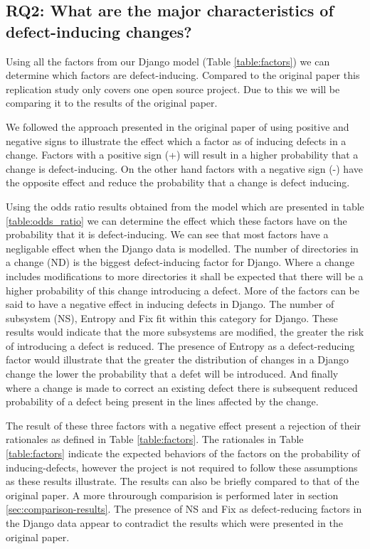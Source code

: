 \documentclass[10pt, conference]{IEEEtran}
\begin{document}
\subsection{RQ2: What are the major characteristics of defect-inducing changes?}
\label{sec:rq2}

Using all the factors from our Django model (Table \ref{table:factors}) we can determine which factors are defect-inducing. Compared to the original paper this replication study only covers one open source project. Due to this we will be comparing it to the results of the original paper. 

We followed the approach presented in the original paper of using positive and negative signs to illustrate the effect which a factor as of inducing defects in a change. Factors with a positive sign (+) will result in a higher probability that a change is defect-inducing. On the other hand factors with a negative sign (-) have the opposite effect and reduce the probability that a change is defect inducing.  

Using the odds ratio results obtained from the model which are presented in table \ref{table:odds_ratio} we can determine the effect which these factors have on the probability that it is defect-inducing.  We can see that most factors have a negligable effect when the Django data is modelled. The number of directories in a change (ND) is the biggest defect-inducing factor for Django. Where a change includes modifications to more directories it shall be expected that there will be a higher probability of this change introducing a defect. More of the factors can be said to have a negative effect in inducing defects in Django. The number of subsystem (NS), Entropy and Fix fit within this category for Django. These results would indicate that the more subsystems are modified, the greater the risk of introducing a defect is reduced. The presence of Entropy as a defect-reducing factor would illustrate that the greater the distribution of changes in a Django change the lower the probability that a defet will be introduced. And finally where a change is made to correct an existing defect there is subsequent reduced probability of a defect being present in the lines affected by the change. 

The result of these three factors with a negative effect present a rejection of their rationales as defined in Table \ref{table:factors}. The rationales in Table \ref{table:factors} indicate the expected behaviors of the factors on the probability of inducing-defects, however the project is not required to follow these assumptions as these results illustrate. The results can also be briefly compared to that of the original paper. A more throurough comparision is performed later in section \ref{sec:comparison-results}.  The presence of NS and Fix as defect-reducing factors in the Django data appear to contradict the results which were presented in the original paper.
\end{document}
